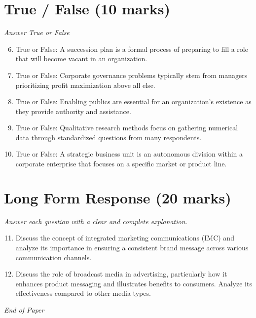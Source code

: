 \documentclass[12pt]{article}
\begin{document}
\section*{True / False (10 marks)}
\textit{Answer True or False}
\begin{enumerate}[label=\arabic*.]
\setcounter{enumi}{5}
\item True or False: A succession plan is a formal process of preparing to fill a role that will become vacant in an organization.
\item True or False: Corporate governance problems typically stem from managers prioritizing profit maximization above all else.
\item True or False: Enabling publics are essential for an organization's existence as they provide authority and assistance.
\item True or False: Qualitative research methods focus on gathering numerical data through standardized questions from many respondents.
\item True or False: A strategic business unit is an autonomous division within a corporate enterprise that focuses on a specific market or product line.
\end{enumerate}

\section*{Long Form Response (20 marks)}
\textit{Answer each question with a clear and complete explanation.}
\begin{enumerate}[label=\arabic*.]
\setcounter{enumi}{10}
\item Discuss the concept of integrated marketing communications (IMC) and analyze its importance in ensuring a consistent brand message across various communication channels.
\item Discuss the role of broadcast media in advertising, particularly how it enhances product messaging and illustrates benefits to consumers. Analyze its effectiveness compared to other media types.
\end{enumerate}

\vfill
\noindent\textit{End of Paper}
\end{document}
